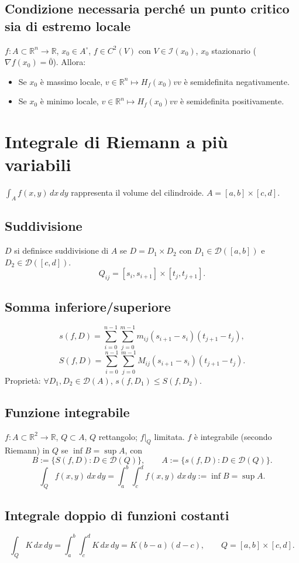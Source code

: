 \documentclass[11pt,a4paper]{article}
\newcommand{\R}{\mathbb R}\newcommand{\N}{\mathbb N}\newcommand{\pagina}[1]{\clearpage}
\begin{document}
\subsection*{Condizione necessaria perché un punto critico sia di estremo locale}
$f:A\subset\R^n\to\R$, $x_0\in A^\circ$, $f\in C^2(V)$ con $V\in\mathcal I(x_0)$, $x_0$ stazionario ($\nabla f(x_0)=\bar0$). Allora:
\begin{itemize}
\item Se $x_0$ è massimo locale, $v\in\R^n\mapsto H_f(x_0)vv$ è semidefinita negativamente.
\item Se $x_0$ è minimo locale, $v\in\R^n\mapsto H_f(x_0)vv$ è semidefinita positivamente.
\end{itemize}
\pagina{35}
\section*{Integrale di Riemann a più variabili}
$\int_A f(x,y)\,dx\,dy$ rappresenta il volume del cilindroide. $A=[a,b]\times[c,d]$.
\subsection*{Suddivisione}
$D$ si definisce suddivisione di $A$ se $D=D_1\times D_2$ con $D_1\in\mathcal D([a,b])$ e $D_2\in\mathcal D([c,d])$.
\[Q_{ij}=[s_i,s_{i+1}]\times[t_j,t_{j+1}].\]
\subsection*{Somma inferiore/superiore}
\[s(f,D)=\sum_{i=0}^{n-1}\sum_{j=0}^{m-1}m_{ij}(s_{i+1}-s_i)(t_{j+1}-t_j),\]
\[S(f,D)=\sum_{i=0}^{n-1}\sum_{j=0}^{m-1}M_{ij}(s_{i+1}-s_i)(t_{j+1}-t_j).\]
Proprietà: $\forall D_1,D_2\in\mathcal D(A)$, $s(f,D_1)\le S(f,D_2)$.
\subsection*{Funzione integrabile}
$f:A\subset\R^2\to\R$, $Q\subset A$, $Q$ rettangolo; $f|_Q$ limitata.
\pagina{36}
$f$ è integrabile (secondo Riemann) in $Q$ se $\inf B=\sup A$, con
\[B:=\{S(f,D):D\in\mathcal D(Q)\},\qquad A:=\{s(f,D):D\in\mathcal D(Q)\}.\]
\[\int_Qf(x,y)\,dx\,dy=\int_a^b\int_c^d f(x,y)\,dx\,dy:=\inf B=\sup A.\]
\subsection*{Integrale doppio di funzioni costanti}
\[\int_Q K\,dx\,dy=\int_a^b\int_c^d K\,dx\,dy=K(b-a)(d-c),\qquad Q=[a,b]\times[c,d].\]
\end{document}
